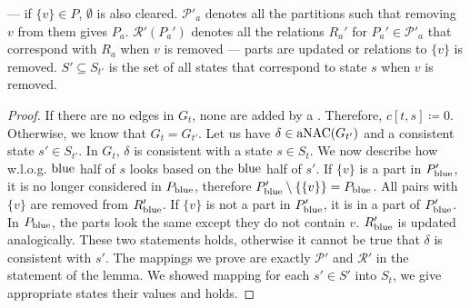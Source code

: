 --- if \( \{v\} \in P \), \( \emptyset \) is also cleared.
\( \mathcal{P'}_a \) denotes all the partitions such that removing \( v \) from them gives \( P_a \).
\( \mathcal{R'}(P_a') \) denotes all the relations \( R_a' \)
for \( P_a' \in \mathcal{P'}_a \) that correspond with \( R_a \) when \( v \) is removed
--- parts are updated or relations to \( \{v\} \) is removed.
\( S' \subseteq S_{t'} \) is the set of all states that
correspond to state \( s \) when \( v \) is removed.
%
\begin{proof}
	If there are no edges in \( G_t \), none are added by a \ForgetVertexNode{}.
	Therefore, \( c[t, s] \coloneqq 0 \).
	Otherwise, we know that \( G_t = G_{t'} \).
	Let us have \( \delta \in \operatorname{aNAC}(G_{t'}) \)
	and a consistent state \( s' \in S_{t'} \).
	In \( G_t \), \( \delta \) is consistent with a state \( s \in S_t \).
	We now describe how w.l.o.g. \( \text{blue} \) half of \( s \) looks
	based on the \( \text{blue} \) half of \( s' \).
	If \( \{v\} \) is a part in \( P_{\text{blue}}' \),
	it is no longer considered in \( P_{\text{blue}} \),
	therefore \( P_{\text{blue}}' \setminus \{\{v\}\} = P_{\text{blue}} \).
	All pairs with \( \{v\} \) are removed from \( R_{\text{blue}}' \).
	If \( \{v\} \) is not a part in \( P_{\text{blue}}' \),
	it is in a part of \( P_{\text{blue}}' \).
	In \( P_{\text{blue}} \), the parts look the same except they do not
	contain \( v \). \( R_{\text{blue}}' \) is updated analogically.
	These two statements holds, otherwise it cannot be true
	that \( \delta \) is consistent with \( s' \).
	The mappings we prove are exactly \( \mathcal{P'} \) and \( \mathcal{R'} \)
	in the statement of the lemma.
	We showed mapping for each \( s' \in S' \) into \( S_t \),
	we give appropriate states their values and  holds.





\end{proof}
